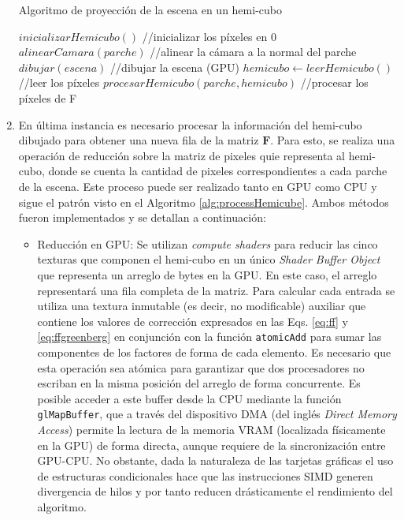 \begin{enumerate}
\begin{algorithm}
	\caption{Algoritmo de proyección de la escena en un hemi-cubo}
	\label{alg:renderHemicube}	
	\begin{algorithmic}
		\State $inicializarHemicubo()$ //inicializar los píxeles en 0
		\State $alinearCamara(parche)$ //alinear la cámara a la normal del parche
		\State $dibujar(escena)$ //dibujar la escena (GPU)
		\State $hemicubo \gets leerHemicubo()$ //leer los píxeles
		\State $procesarHemicubo(parche, hemicubo)$ //procesar los píxeles de F
		\EndLoop
		\EndFunction
	\end{algorithmic}
\end{algorithm}

	\item En última instancia es necesario procesar la información del hemi-cubo dibujado para obtener una nueva fila de la matriz $\mathbf{F}$. Para esto, se realiza una operación de reducción sobre la matriz de pixeles quie representa al hemi-cubo, donde se cuenta la cantidad de pixeles correspondientes a cada parche de la escena. Este proceso puede ser realizado tanto en GPU como CPU y sigue el patrón visto en el Algoritmo \ref{alg:processHemicube}. Ambos métodos fueron implementados y se detallan a continuación:
	\begin{itemize}
		\item Reducción en GPU: Se utilizan \textit{compute shaders} para reducir las cinco texturas que componen el hemi-cubo en un único \textit{Shader Buffer Object} que representa un arreglo de bytes en la GPU. En este caso, el arreglo representará una fila completa de la matriz. Para calcular cada entrada se utiliza una textura inmutable (es decir, no modificable) auxiliar que contiene los valores de corrección expresados en las Eqs. \eqref{eq:ff} y \eqref{eq:ffgreenberg} en conjunción con la función \verb|atomicAdd| para sumar las componentes de los factores de forma de cada elemento. Es necesario que esta operación sea atómica para garantizar que dos procesadores no escriban en la misma posición del arreglo de forma concurrente.
		Es posible acceder a este buffer desde la CPU mediante la función \verb|glMapBuffer|, que a través del dispositivo DMA (del inglés \textit{Direct Memory Access}) permite la lectura de la memoria VRAM (localizada físicamente en la GPU) de forma directa, aunque requiere de la sincronización entre GPU-CPU.
		No obstante, dada la naturaleza de las tarjetas gráficas el uso de estructuras condicionales hace que las instrucciones SIMD generen divergencia de hilos y por tanto reducen drásticamente el rendimiento del algoritmo.

\end{itemize}
\end{enumerate}
